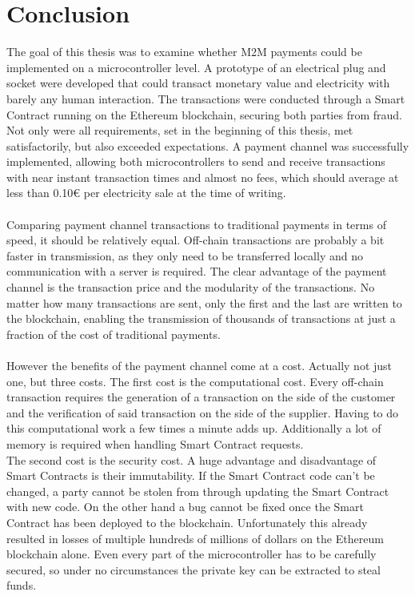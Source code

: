 \section{Conclusion}
The goal of this thesis was to examine whether M2M payments could be implemented on a microcontroller level. A prototype of an electrical plug and socket were developed that could transact monetary value and electricity with barely any human interaction. The transactions were conducted through a Smart Contract running on the Ethereum blockchain, securing both parties from fraud. Not only were all requirements, set in the beginning of this thesis, met satisfactorily, but also exceeded expectations. A payment channel was successfully implemented, allowing both microcontrollers to send and receive transactions with near instant transaction times and almost no fees, which should average at less than 0.10\euro{} per electricity sale at the time of writing.
\\\\
Comparing payment channel transactions to traditional payments in terms of speed, it should be relatively equal. Off-chain transactions are probably a bit faster in transmission, as they only need to be transferred locally and no communication with a server is required. The clear advantage of the payment channel is the transaction price and the modularity of the transactions. No matter how many transactions are sent, only the first and the last are written to the blockchain, enabling the transmission of thousands of transactions at just a fraction of the cost of traditional payments.
\\\\
However the benefits of the payment channel come at a cost. Actually not just one, but three costs. The first cost is the computational cost. Every off-chain transaction requires the generation of a transaction on the side of the customer and the verification of said transaction on the side of the supplier. Having to do this computational work a few times a minute adds up. Additionally a lot of memory is required when handling Smart Contract requests. 
\\
The second cost is the security cost. A huge advantage and disadvantage of Smart Contracts is their immutability. If the Smart Contract code can’t be changed, a party cannot be stolen from through updating the Smart Contract with new code. On the other hand a bug cannot be fixed once the Smart Contract has been deployed to the blockchain. Unfortunately this already resulted in losses of multiple hundreds of millions of dollars on the Ethereum blockchain alone. Even every part of the microcontroller has to be carefully secured, so under no circumstances the private key can be extracted to steal funds.
